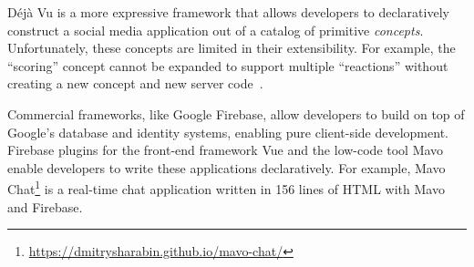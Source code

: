 

Déjà Vu is a more expressive framework that allows developers
to declaratively construct a social media application out
of a catalog of primitive \emph{concepts}.
Unfortunately, these concepts are limited in their extensibility.
For example, the ``scoring'' concept cannot be expanded
to support multiple ``reactions''
without creating a new concept and new server code~\cite{dejavu}.

Commercial frameworks, like Google Firebase, allow developers
to build on top of Google's database and identity systems,
enabling pure client-side development.
Firebase plugins for the front-end framework Vue and the low-code tool
Mavo~\cite{mavo} enable developers to write these applications declaratively.
For example, Mavo Chat\footnote{
    \url{https://dmitrysharabin.github.io/mavo-chat/}
} is a real-time chat application written in 156 lines of HTML
with Mavo and Firebase.


